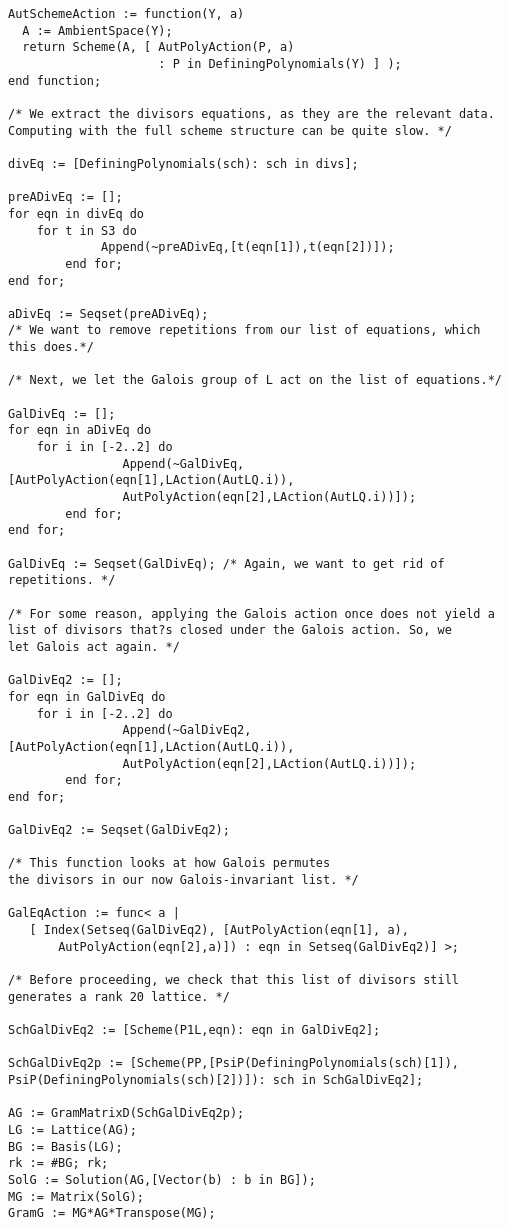 \documentclass[12pt,twoside]{reedthesis}
\theoremstyle{plain}
\theoremstyle{definition}
\theoremstyle{remark}
\begin{document}
\begin{appendices}
\begin{verbatim}
AutSchemeAction := function(Y, a)
  A := AmbientSpace(Y);
  return Scheme(A, [ AutPolyAction(P, a) 
                     : P in DefiningPolynomials(Y) ] );
end function;

/* We extract the divisors equations, as they are the relevant data. 
Computing with the full scheme structure can be quite slow. */

divEq := [DefiningPolynomials(sch): sch in divs];

preADivEq := [];
for eqn in divEq do
	for t in S3 do
             Append(~preADivEq,[t(eqn[1]),t(eqn[2])]);
        end for;
end for;

aDivEq := Seqset(preADivEq); 
/* We want to remove repetitions from our list of equations, which this does.*/

/* Next, we let the Galois group of L act on the list of equations.*/

GalDivEq := []; 
for eqn in aDivEq do
    for i in [-2..2] do
                Append(~GalDivEq,[AutPolyAction(eqn[1],LAction(AutLQ.i)),
                AutPolyAction(eqn[2],LAction(AutLQ.i))]);
        end for;
end for;

GalDivEq := Seqset(GalDivEq); /* Again, we want to get rid of repetitions. */

/* For some reason, applying the Galois action once does not yield a
list of divisors that?s closed under the Galois action. So, we
let Galois act again. */

GalDivEq2 := [];
for eqn in GalDivEq do
    for i in [-2..2] do
                Append(~GalDivEq2,[AutPolyAction(eqn[1],LAction(AutLQ.i)),
                AutPolyAction(eqn[2],LAction(AutLQ.i))]);
        end for;
end for;

GalDivEq2 := Seqset(GalDivEq2);

/* This function looks at how Galois permutes 
the divisors in our now Galois-invariant list. */

GalEqAction := func< a | 
   [ Index(Setseq(GalDivEq2), [AutPolyAction(eqn[1], a),
       AutPolyAction(eqn[2],a)]) : eqn in Setseq(GalDivEq2)] >; 

/* Before proceeding, we check that this list of divisors still 
generates a rank 20 lattice. */

SchGalDivEq2 := [Scheme(P1L,eqn): eqn in GalDivEq2];

SchGalDivEq2p := [Scheme(PP,[PsiP(DefiningPolynomials(sch)[1]),
PsiP(DefiningPolynomials(sch)[2])]): sch in SchGalDivEq2];

AG := GramMatrixD(SchGalDivEq2p);
LG := Lattice(AG);
BG := Basis(LG);
rk := #BG; rk;
SolG := Solution(AG,[Vector(b) : b in BG]);
MG := Matrix(SolG);
GramG := MG*AG*Transpose(MG);


\end{verbatim}
\end{appendices}
\end{document}
